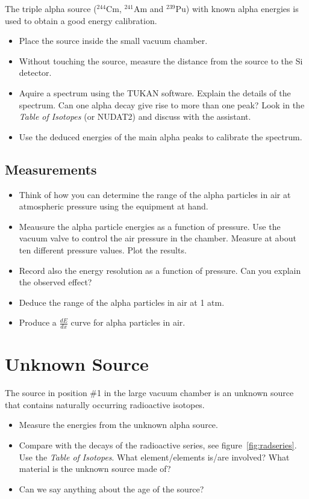\documentclass[12pt]{article}
\begin{document}
The triple alpha source ($^{244}\mbox{Cm}$, $^{241}\mbox{Am}$ 
and $^{239}\mbox{Pu}$) with
known alpha energies is used to obtain a good energy calibration.

\begin{itemize}
\item Place the source inside the small vacuum chamber.
\item Without touching the source, measure the distance from the source
 to the Si detector.
\item Aquire a spectrum using the TUKAN software. Explain the details of the spectrum. 
Can one alpha decay give rise to more than one peak? Look in the \emph{Table of Isotopes} 
(or NUDAT2) and discuss with the assistant.
\item Use the deduced energies of the main alpha peaks to calibrate the spectrum.
\end{itemize}

\subsection{Measurements}

\begin{itemize}
  
\item Think of how you can determine the range of the alpha particles
  in air at atmospheric pressure using the equipment at hand.
  
\item Meausure the alpha particle energies as a function of pressure. Use the vacuum valve to control the air
  pressure in the chamber. Measure at about ten different pressure values. Plot the results.

\item Record also the energy resolution as a function of pressure. Can you explain the observed effect?

\item Deduce the range of the alpha particles in air at 1 atm.

\item Produce a $\frac{dE}{dx}$ curve for alpha particles in air.
\end{itemize}


\section{Unknown Source}
The source in position \#1 in the large vacuum chamber is an
unknown source that contains naturally occurring radioactive isotopes.
\begin{itemize}
\item Measure the energies from the unknown alpha source.
\item Compare with the decays of the radioactive series, see 
figure~\ref{fig:radseries}. Use the \emph{Table of Isotopes}. 
What element/elements is/are involved? What material is the unknown 
source made of?
\item Can we say anything about the age of the source?
\end{itemize}
\end{document}
